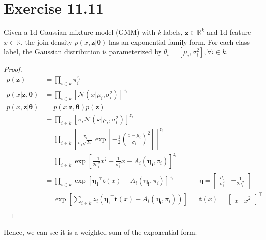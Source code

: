 \documentclass[11pt, letterpaper]{article}
\begin{document}
\section{Exercise 11.11}
Given a 1d Gaussian mixture model (GMM) with $k$ labels, $\mathbf{z} \in {\mathbb{R}^k}$ and 1d feature $x \in \mathbb{R}$, the join density $p(x, \mathbf{z}|\boldsymbol{\theta})$ has an exponential family form. For each class-label, the Gaussian distribution is parameterized by $\theta_i = [\mu_i, \sigma_i^2], \forall i \in k$.
\begin{proof}
\begin{align*}
    p(\mathbf{z}) &= \prod_{i \in k} \pi_i^{z_i} \\
    p(x | \mathbf{z}, \boldsymbol{\theta}) &= \prod_{i \in k} [\mathcal{N}(x|\mu_i, \sigma_i^2)]^{z_i} \\
    p(x, \mathbf{z}|\boldsymbol{\theta}) &= p(x | \mathbf{z}, \boldsymbol{\theta}) p(\mathbf{z}) \\
        &= \prod_{i \in k} [\pi_i \mathcal{N}(x|\mu_i, \sigma_i^2)]^{z_i} \\
        &= \prod_{i \in k} [\frac{\pi_i}{\sigma_i \sqrt{2\pi}} \exp[-\frac{1}{2} (\frac{x-\mu_i}{\sigma_i})^2]]^{z_i} \\
        &= \prod_{i \in k} \exp[\frac{-1}{2\sigma_i^2}x^2 + \frac{1}{\sigma_i^2}x - A_{i}(\boldsymbol{\eta_i}, \pi_i)]^{z_i} \\
        &= \prod_{i \in k} \exp[\boldsymbol{\eta_i}^{\intercal}\boldsymbol{t}(x) - A_{i}(\boldsymbol{\eta_i}, \pi_i)]^{z_i}
            && \boldsymbol{\eta} = \begin{bmatrix}\frac{\mu_i}{\sigma_i^2} & -\frac{1}{2\sigma_i^2}\end{bmatrix}^{\intercal} \\
        &= \exp[\sum_{i \in k} z_i (\boldsymbol{\eta_i}^{\intercal}\boldsymbol{t}(x) - A_{i}(\boldsymbol{\eta_i}, \pi_i))]
            && \boldsymbol{t}(x) = \begin{bmatrix}x & x^2\end{bmatrix}^{\intercal} \\
\end{align*}
\end{proof}
Hence, we can see it is a weighted sum of the exponential form.
\end{document}
